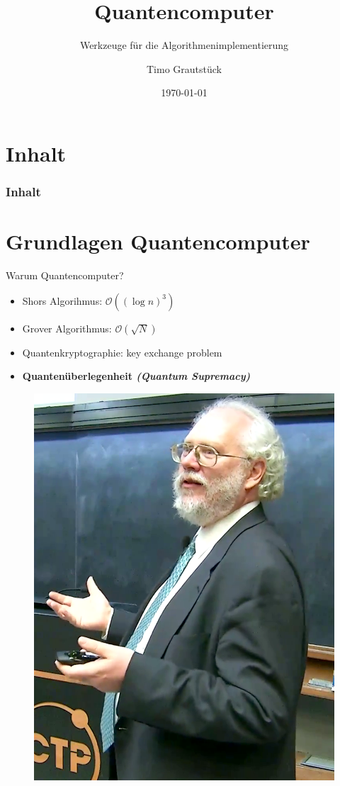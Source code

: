 \documentclass[compress,aspectratio=1610]{beamer}
\title{Quantencomputer}
\subtitle{Werkzeuge f\"ur die Algorithmenimplementierung}
\date{\today}
\author{Timo Grautst\"uck}
\institute[]{
  Fachhochschule Dortmund \\
  FB 10: Informationstechnik
}
\begin{document}
\maketitle

\section*{Inhalt}
\begin{frame}
  \frametitle{Inhalt}
  \centering
  \tableofcontents[hideallsubsections]
\end{frame}

\section{Grundlagen Quantencomputer}
\begin{frame}{Warum Quantencomputer?}
  \begin{minipage}{0.6\textwidth}
    \begin{itemize}
    \item Shors Algorihmus: $\mathcal{O}((\log n)^3)$
    \item Grover Algorithmus: $\mathcal{O}(\sqrt{N})$
    \item Quantenkryptographie: key exchange problem
    \item \textbf{Quanten\"uberlegenheit \textit{(Quantum Supremacy)}}
    \end{itemize}
  \end{minipage}
  \hfill
  \begin{minipage}{0.3\textwidth}
    \begin{figure}[h]
      \centering
      \includegraphics[width=1\textwidth]{figures/Peter_Shor_2017.png}

\end{figure}
\end{minipage}
\end{frame}
\end{document}
